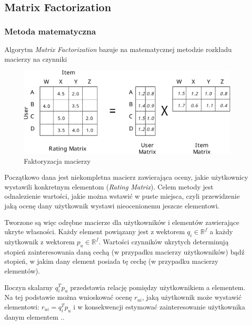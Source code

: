 \documentclass[twoside]{iisthesis}
\begin{document}
		 \subsection{Matrix Factorization}
		
		 \subsubsection{Metoda matematyczna}	
	
		 Algorytm \textit{Matrix Factorization} bazuje na matematycznej metodzie rozkładu macierzy na czynniki
	
	
			  \begin{figure}[!ht] 
			  	\centering
			  	\includegraphics[width=1\textwidth]{factorization}
			  	\caption{Faktoryzacja macierzy \protect\cite{id:ComputingRecommendationsExtremeScaleApacheFlink}}
			  	\label{fig:factorization}
			  \end{figure}
			 
		Początkowo dana jest niekompletna macierz zawierająca oceny, jakie użytkownicy wystawili konkretnym elementom (\textit{Rating Matrix}). Celem metody jest odnalezienie wartości, jakie można wstawić w puste miejsca, czyli przewidzenie jaką ocenę dany użytkownik wystawi nieocenionemu jeszcze elementowi. 		
		
		Tworzone są więc odrębne macierze dla użytkowników i elementów zawierające ukryte własności. Każdy element powiązany jest z wektorem $q_i \in \mathbb{R} ^f$ a każdy użytkownik z wektorem $p_u \in \mathbb{R} ^f$. Wartości czynników ukrytych determinują stopień zainteresowania daną cechą (w przypadku macierzy użytkowników) bądź stopień, w jakim dany element posiada tę cechę (w przypadku macierzy elementów).		
		
		Iloczyn skalarny $q_i^T p_u$ przedstawia relację pomiędzy użytkownikiem a elementem. Na tej podstawie można wnioskować ocenę $r_{ui}$, jaką użytkownik może wystawić elementowi: $r_{ui} = q_i^T p_u$ i w konsekwencji estymować zainteresowanie użytkownika danym elementem \cite{koren2009matrix}..
		
\end{document}

